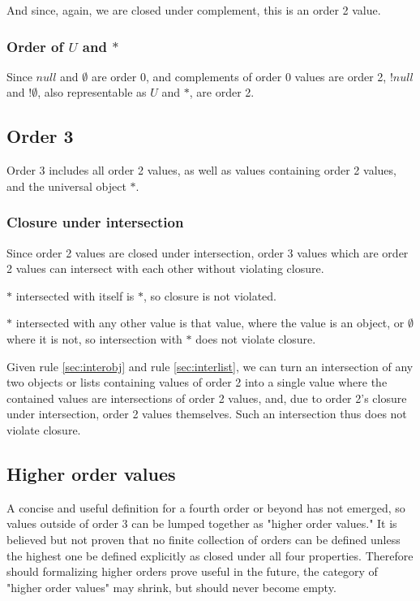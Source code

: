 \documentclass[letterpaper]{article}
\begin{document}
And since, again, we are closed under complement, this is an order 2 value.

\subsubsection{Order of \(U\) and \(*\)}

Since \(null\) and \(\emptyset\) are order 0, and complements of order 0 values
are order 2, \(!null\) and \(!\emptyset\), also representable as \(U\) and
\(*\), are order 2.

\subsection{Order 3}
Order 3 includes all order 2 values, as well as values containing order 2
values, and the universal object \({ * }\).

\subsubsection{Closure under intersection}

Since order 2 values are closed under intersection, order 3 values which are
order 2 values can intersect with each other without violating closure.

\({ * }\) intersected with itself is \({ * }\), so closure is not violated.

\({ * }\) intersected with any other value is that value, where the value is an
object, or \(\emptyset\) where it is not, so intersection with \({ * }\) does
not violate closure.

Given rule \ref{sec:interobj} and rule \ref{sec:interlist}, we can turn an
intersection of any two objects or lists containing values of order 2 into a
single value where the contained values are intersections of order 2 values,
and, due to order 2's closure under intersection, order 2 values themselves.
Such an intersection thus does not violate closure.

\subsection{Higher order values}

A concise and useful definition for a fourth order or beyond has not emerged,
so values outside of order 3 can be lumped together as "higher order values."
It is believed but not proven that no finite collection of orders can be
defined unless the highest one be defined explicitly as closed under all four
properties. Therefore should formalizing higher orders prove useful in the
future, the category of "higher order values" may shrink, but should never
become empty.
\end{document}
